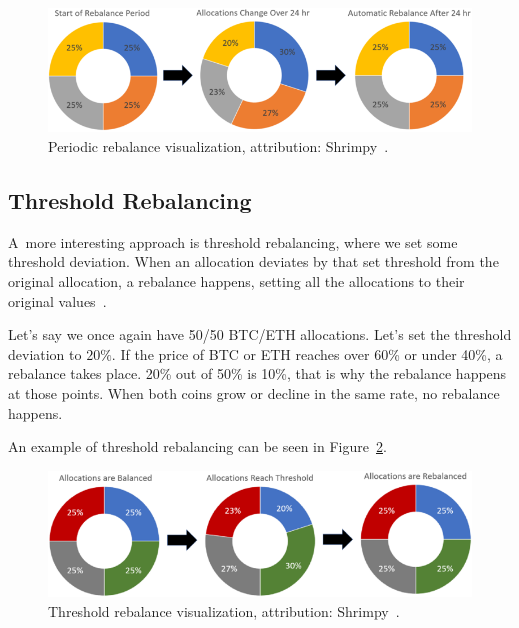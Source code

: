 \begin{figure}[!t]
    \centering
    \includegraphics[width=\columnwidth]{figures/periodic-rebalance.png}
    \caption{Periodic rebalance visualization, attribution: Shrimpy~\cite{portfolio-rebalancing}.}
    \label{periodic-rebalance-figure}
\end{figure}

\subsection*{Threshold Rebalancing}
A~more interesting approach is threshold rebalancing, where we set some threshold deviation. When an allocation deviates by that set threshold from the original allocation, a rebalance happens, setting all the allocations to their original values~\cite{portfolio-rebalancing}.

Let's say we once again have 50/50 BTC/ETH allocations. Let's set the threshold deviation to $20\%$. If the price of BTC or ETH reaches over 60\% or under 40\%, a rebalance takes place. 20\% out of 50\% is 10\%, that is why the rebalance happens at those points. When both coins grow or decline in the same rate, no rebalance happens.

An example of threshold rebalancing can be seen in Figure~\ref{threshold-rebalance-figure}.

\begin{figure}[!t]
    \centering
    \includegraphics[width=\columnwidth]{figures/threshold-rebalance.png}
    \caption{Threshold rebalance visualization, attribution: Shrimpy~\cite{portfolio-rebalancing}.}
    \label{threshold-rebalance-figure}
\end{figure}

